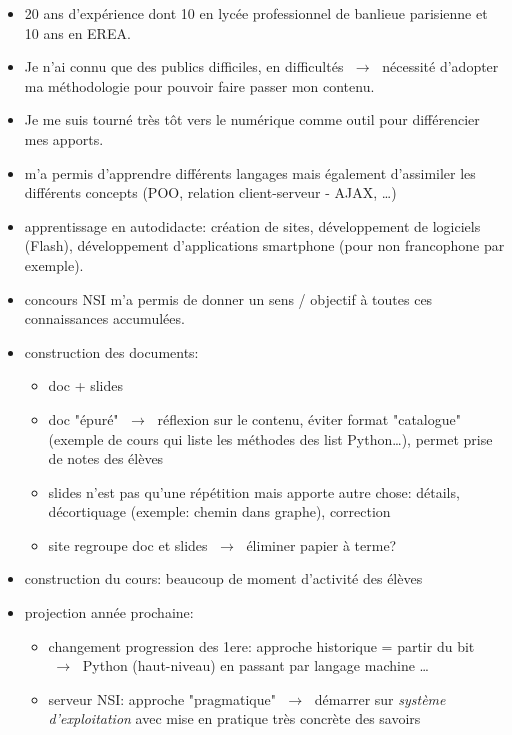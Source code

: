 \documentclass[a4paper,11pt]{article}
\begin{document}
\begin{itemize}
    \item 20 ans d'expérience dont 10 en lycée professionnel de banlieue parisienne et 10 ans en EREA.
    \item Je n'ai connu que des publics difficiles, en difficultés $\;\rightarrow\;$ nécessité d'adopter ma méthodologie pour pouvoir faire passer mon contenu.
    \item Je me suis tourné très tôt vers le numérique comme outil pour différencier mes apports.
    \item m'a permis d'apprendre différents langages mais également d'assimiler les différents concepts (POO, relation client-serveur - AJAX, \dots)
    \item apprentissage en autodidacte: création de sites, développement de logiciels (Flash), développement d'applications smartphone (pour non francophone par exemple).
    \item concours NSI m'a permis de donner un sens / objectif à toutes ces connaissances accumulées.
    \item construction des documents:
          \begin{itemize}
              \item doc + slides
              \item doc "épuré" $\;\rightarrow\;$ réflexion sur le contenu, éviter format "catalogue" (exemple de cours qui liste les méthodes des list Python\dots), permet prise de notes des élèves
              \item slides n'est pas qu'une répétition mais apporte autre chose: détails, décortiquage (exemple: chemin dans graphe), correction
              \item site regroupe doc et slides $\;\rightarrow\;$ éliminer papier à terme?
          \end{itemize}
    \item construction du cours: beaucoup de moment d'activité des élèves
    \item projection année prochaine:
    \begin{itemize}
        \item changement progression des 1ere: approche historique = partir du bit $\;\rightarrow\;$ Python (haut-niveau) en passant par langage machine \dots
        \item serveur NSI: approche "pragmatique" $\;\rightarrow\;$ démarrer sur \emph{système d'exploitation} avec mise en pratique très concrète des savoirs
    \end{itemize}
\end{itemize}
\end{document}

